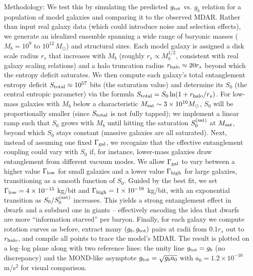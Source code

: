 \documentclass[11pt]{article}
\begin{document}
Methodology: We test this by simulating the predicted $g_{\rm tot}$ vs. $g_b$ relation for a population of model galaxies and comparing it to the observed MDAR. Rather than input real galaxy data (which could introduce noise and selection effects), we generate an idealized ensemble spanning a wide range of baryonic masses ($M_b = 10^9$ to $10^{12}\,M_\odot$) and structural sizes. Each model galaxy is assigned a disk scale radius $r_s$ that increases with $M_b$ (roughly $r_s \propto M_b^{1/2}$, consistent with real galaxy scaling relations) and a halo truncation radius $r_{\rm halo}\approx 20 r_s$ beyond which the entropy deficit saturates. We then compute each galaxy’s total entanglement entropy deficit $S_{\rm total}\approx 10^{57}$ bits (the saturation value) and determine its $S_0$ (the central entropic parameter) via the formula $S_{\rm total} = S_0 \ln(1 + r_{\rm halo}/r_s)$. For low-mass galaxies with $M_b$ below a characteristic $M_{\rm sat}\sim 3\times10^{10}M_\odot$, $S_0$ will be proportionally smaller (since $S_{\rm total}$ is not fully tapped); we implement a linear ramp such that $S_0$ grows with $M_b$ until hitting the saturation $S_0^{\rm (sat)}$ at $M_{\rm sat}$, beyond which $S_0$ stays constant (massive galaxies are all saturated). Next, instead of assuming one fixed $\Gamma_{\rm gal}$, we recognize that the effective entanglement coupling could vary with $S_0$ if, for instance, lower-mass galaxies draw entanglement from different vacuum modes. We allow $\Gamma_{\rm gal}$ to vary between a higher value $\Gamma_{\rm low}$ for small galaxies and a lower value $\Gamma_{\rm high}$ for large galaxies, transitioning as a smooth function of $S_0$. Guided by the best fit, we set $\Gamma_{\rm low}=4\times10^{-15}$ kg/bit and $\Gamma_{\rm high}=1\times10^{-16}$ kg/bit, with an exponential transition as $S_0/S_0^{\rm (sat)}$ increases. This yields a strong entanglement effect in dwarfs and a subdued one in giants – effectively encoding the idea that dwarfs are more “information starved” per baryon. Finally, for each galaxy we compute rotation curves as before, extract many $(g_b, g_{\rm tot})$ pairs at radii from $0.1 r_s$ out to $r_{\rm halo}$, and compile all points to trace the model’s MDAR. The result is plotted on a log–log plane along with two reference lines: the unity line $g_{\rm tot}=g_b$ (no discrepancy) and the MOND-like asymptote $g_{\rm tot}=\sqrt{g_b a_0}$ with $a_0=1.2\times10^{-10}$ m/s$^2$ for visual comparison.
\end{document}
